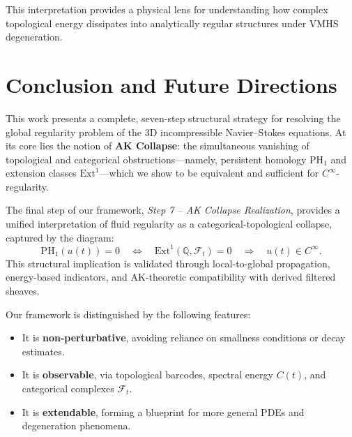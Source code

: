 \documentclass[11pt]{article}
\theoremstyle{definition}
\begin{document}
This interpretation provides a physical lens for understanding how complex topological energy dissipates into analytically regular structures under VMHS degeneration.


\section*{Conclusion and Future Directions}

This work presents a complete, seven-step structural strategy for resolving the global regularity problem of the 3D incompressible Navier–Stokes equations.  
At its core lies the notion of \textbf{AK Collapse}: the simultaneous vanishing of topological and categorical obstructions—namely, persistent homology $\mathrm{PH}_1$ and extension classes $\mathrm{Ext}^1$—which we show to be equivalent and sufficient for $C^\infty$-regularity.

\medskip

\noindent
The final step of our framework, \emph{Step 7 – AK Collapse Realization}, provides a unified interpretation of fluid regularity as a categorical-topological collapse, captured by the diagram:
\[
\mathrm{PH}_1(u(t)) = 0 \quad \Longleftrightarrow \quad \mathrm{Ext}^1(\mathbb{Q}, \mathcal{F}_t) = 0 \quad \Longrightarrow \quad u(t) \in C^\infty.
\]
This structural implication is validated through local-to-global propagation, energy-based indicators, and AK-theoretic compatibility with derived filtered sheaves.

\medskip

\noindent
Our framework is distinguished by the following features:
\begin{itemize}
    \item It is \textbf{non-perturbative}, avoiding reliance on smallness conditions or decay estimates.
    \item It is \textbf{observable}, via topological barcodes, spectral energy $C(t)$, and categorical complexes $\mathcal{F}_t$.
    \item It is \textbf{extendable}, forming a blueprint for more general PDEs and degeneration phenomena.
\end{itemize}

\medskip
\end{document}
